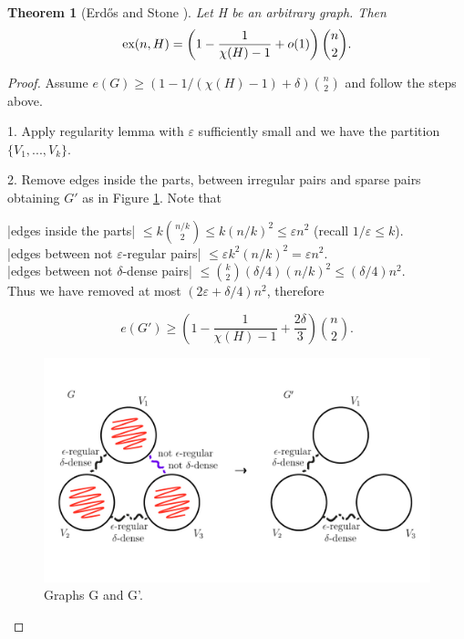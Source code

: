 \documentclass[12pt,twoside,a4paper,bibliography=totocnumbered]{book}
\numberwithin{equation}{section}
\newtheorem{theorem}             {Theorem}[section]
\theoremstyle{remark}
\def\ex{\mathop{\text{\rm ex}}\nolimits}
\begin{document}
\begin{theorem}[{Erd\H{o}s and Stone \cite{ErSt46}}] Let H be an arbitrary graph. Then
$$ \ex(n,H) = \left(1-\frac{1}{\chi (H)-1} + o(1)\right) \binom{n}{2}.$$ 
\end{theorem}

\begin{proof}


Assume $e(G) \geq (1 - 1/(\chi(H) - 1) + \delta)\binom{n}{2}$ and follow the steps above.

1. Apply regularity lemma with $\varepsilon$ sufficiently small and we have the partition $\{V_1, ... , V_k\}$.

2. Remove edges inside the parts, between irregular pairs and sparse pairs obtaining $G'$ as in Figure \ref{fig:graph-G-and-G'}.
Note that

|edges inside the parts| $\leq k\binom{n/k}{2} \leq k(n/k)^2 \leq \varepsilon n^2$ (recall $1/\varepsilon \leq k$).\\

|edges between not $\varepsilon$-regular pairs| $\leq \varepsilon k^2 (n/k)^2 = \varepsilon n^2$.\\

|edges between not $\delta$-dense pairs| $\leq \binom{k}{2}(\delta/4) (n/k)^2 \leq (\delta /4)n^2$.\\ 

Thus we have removed at most $(2\varepsilon + \delta/4)n^2$, therefore 

$$ e(G') \geq  \left( 1 - \frac{1}{\chi(H) - 1} + \frac{2 \delta}{3}\right) \binom{n}{2}.$$

\begin{figure}[H]
     \centering
     \includegraphics[scale=1.5]{Figuras/graph-G-and-G'.jpg}
     \caption{Graphs G and G'.}
     \label{fig:graph-G-and-G'}
\end{figure}


\end{proof}
\end{document}
